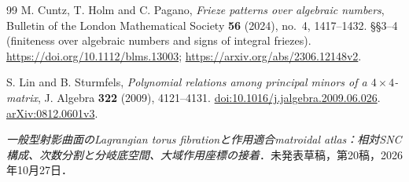 \begin{thebibliography}{99}
M. Cuntz, T. Holm and C. Pagano,
\emph{Frieze patterns over algebraic numbers},
Bulletin of the London Mathematical Society \textbf{56} (2024), no.~4, 1417--1432.
\S\S3--4 (finiteness over algebraic numbers and signs of integral friezes).
\url{https://doi.org/10.1112/blms.13003};
\url{https://arxiv.org/abs/2306.12148v2}.

S. Lin and B. Sturmfels,
\emph{Polynomial relations among principal minors of a $4\times4$-matrix},
J. Algebra \textbf{322} (2009), 4121--4131.
\href{https://doi.org/10.1016/j.jalgebra.2009.06.026}{doi:10.1016/j.jalgebra.2009.06.026}.
\href{https://arxiv.org/abs/0812.0601}{arXiv:0812.0601v3}.

\emph{一般型射影曲面のLagrangian torus fibrationと作用適合matroidal atlas：相対SNC構成、次数分割と分岐底空間、大域作用座標の接着}．未発表草稿，第20稿，2026年10月27日．

\end{thebibliography}
